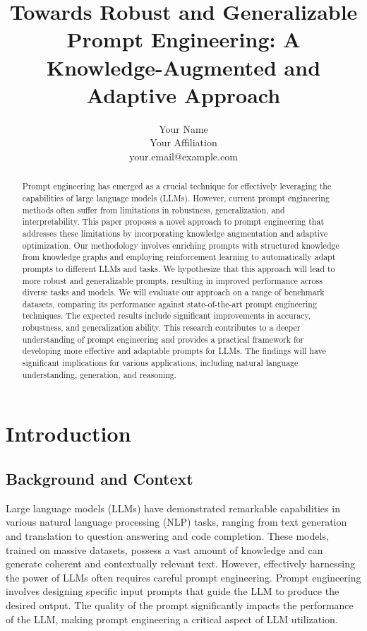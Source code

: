 \documentclass{article}
\title{Towards Robust and Generalizable Prompt Engineering: A Knowledge-Augmented and Adaptive Approach}
\author{Your Name \\ Your Affiliation \\ your.email@example.com}
\date{}
\begin{document}
\maketitle

\begin{abstract}
Prompt engineering has emerged as a crucial technique for effectively leveraging the capabilities of large language models (LLMs). However, current prompt engineering methods often suffer from limitations in robustness, generalization, and interpretability. This paper proposes a novel approach to prompt engineering that addresses these limitations by incorporating knowledge augmentation and adaptive optimization. Our methodology involves enriching prompts with structured knowledge from knowledge graphs and employing reinforcement learning to automatically adapt prompts to different LLMs and tasks. We hypothesize that this approach will lead to more robust and generalizable prompts, resulting in improved performance across diverse tasks and models. We will evaluate our approach on a range of benchmark datasets, comparing its performance against state-of-the-art prompt engineering techniques. The expected results include significant improvements in accuracy, robustness, and generalization ability. This research contributes to a deeper understanding of prompt engineering and provides a practical framework for developing more effective and adaptable prompts for LLMs. The findings will have significant implications for various applications, including natural language understanding, generation, and reasoning.
\end{abstract}

\section{Introduction}

\subsection{Background and Context}

Large language models (LLMs) have demonstrated remarkable capabilities in various natural language processing (NLP) tasks, ranging from text generation and translation to question answering and code completion. These models, trained on massive datasets, possess a vast amount of knowledge and can generate coherent and contextually relevant text. However, effectively harnessing the power of LLMs often requires careful prompt engineering. Prompt engineering involves designing specific input prompts that guide the LLM to produce the desired output. The quality of the prompt significantly impacts the performance of the LLM, making prompt engineering a critical aspect of LLM utilization.
\end{document}
